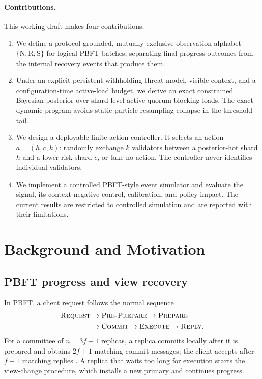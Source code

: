 \documentclass[10pt,conference]{IEEEtran}
\newcommand{\N}{\mathrm{N}}
\newcommand{\R}{\mathrm{R}}
\newcommand{\Sstall}{\mathrm{S}}
\begin{document}
\paragraph{Contributions.} This working draft makes four contributions.
\begin{enumerate}[leftmargin=13pt,itemsep=1pt]
\item We define a protocol-grounded, mutually exclusive observation alphabet $\{\N,\R,\Sstall\}$ for logical PBFT batches, separating final progress outcomes from the internal recovery events that produce them.
\item Under an explicit persistent-withholding threat model, visible context, and a configuration-time active-load budget, we derive an exact constrained Bayesian posterior over shard-level active quorum-blocking loads. The exact dynamic program avoids static-particle resampling collapse in the threshold tail.
\item We design a deployable finite action controller. It selects an action $a=(h,c,k)$: randomly exchange $k$ validators between a posterior-hot shard $h$ and a lower-risk shard $c$, or take no action. The controller never identifies individual validators.
\item We implement a controlled PBFT-style event simulator and evaluate the signal, its context negative control, calibration, and policy impact. The current results are restricted to controlled simulation and are reported with their limitations.
\end{enumerate}

\section{Background and Motivation}

\subsection{PBFT progress and view recovery}

In PBFT, a client request follows the normal sequence
\begin{equation}
\begin{aligned}
\textsc{Request} &\rightarrow \textsc{Pre-Prepare} \rightarrow \textsc{Prepare} \\
&\rightarrow \textsc{Commit} \rightarrow \textsc{Execute} \rightarrow \textsc{Reply}.
\end{aligned}
\end{equation}
For a committee of $n=3f+1$ replicas, a replica commits locally after it is prepared and obtains $2f+1$ matching commit messages; the client accepts after $f+1$ matching replies \cite{castro1999pbft}. A replica that waits too long for execution starts the view-change procedure, which installs a new primary and continues progress.
\end{document}
